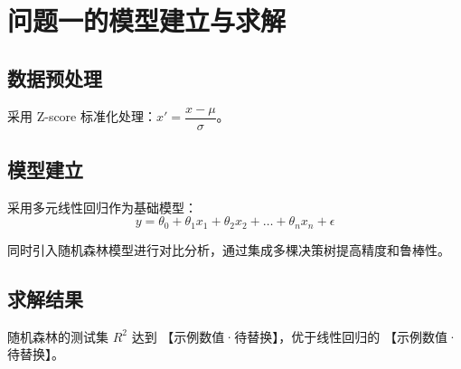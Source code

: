 \section{问题一的模型建立与求解}

\subsection{数据预处理}

采用 Z-score 标准化处理：$x' = \dfrac{x - \mu}{\sigma}$。

\subsection{模型建立}

采用多元线性回归作为基础模型：
\[
  y = \theta_0 + \theta_1 x_1 + \theta_2 x_2 + \dots + \theta_n x_n + \epsilon
\]

同时引入随机森林模型进行对比分析，通过集成多棵决策树提高精度和鲁棒性。

\subsection{求解结果}

随机森林的测试集 $R^2$ 达到 【示例数值·待替换】，优于线性回归的 【示例数值·待替换】。
